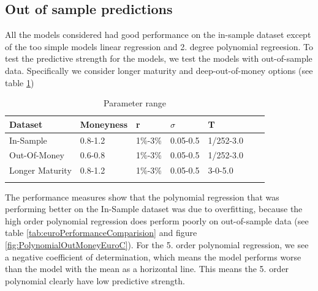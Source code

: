\subsection{Out of sample predictions}
All the models considered had good performance on the in-sample dataset except of the too simple models linear regression and 2. degree polynomial regreesion. To test the predictive strength for the models, we test the models with out-of-sample data. Specifically we consider longer maturity and deep-out-of-money options (see table \ref{tab:totalEuroParRange})
\begin{table}[H]
\caption{Parameter range}
\label{tab:totalEuroParRange}
\centering
\begin{tabular}{l l l l l l l }
\toprule
\textbf{Dataset} & \textbf{Moneyness} & \textbf{r} & \textbf{$\sigma$} & \textbf{T} \\
\midrule
In-Sample & 0.8-1.2 & 1\%-3\% & 0.05-0.5 & 1/252-3.0\\ 
Out-Of-Money & 0.6-0.8 & 1\%-3\% & 0.05-0.5 & 1/252-3.0\\ 
Longer Maturity & 0.8-1.2 & 1\%-3\% & 0.05-0.5 & 3-0-5.0\\ 
\bottomrule\\
\end{tabular}
\end{table}
The performance measures show that the polynomial regression that was performing better on the In-Sample dataset was due to overfitting, because the high order polynomial regression does perform poorly on out-of-sample data (see table \ref{tab:euroPerformanceComparision} and figure \ref{fig:PolynomialOutMoneyEuroC}). For the 5. order polynomial regression, we see a negative coefficient of determination, which means the model performs worse than the model with the mean as a horizontal line. This means the 5. order polynomial clearly have low predictive strength. 

